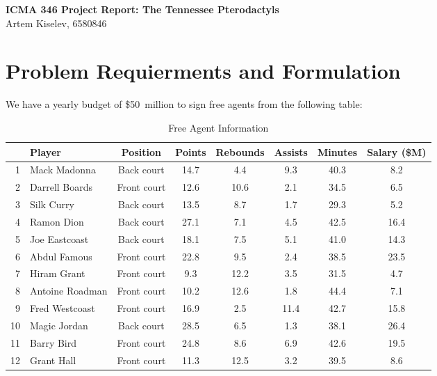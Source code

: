\documentclass[a4paper,11pt]{article}
\begin{document}
{\Large \textbf{ICMA 346 Project Report: The Tennessee Pterodactyls}}\\
{\normalsize Artem Kiselev, 6580846}

\section{Problem Requierments and Formulation}
We have a yearly budget of \$50~million to sign free agents from the following table:

\begin{table}[htbp]
\centering
\renewcommand{\arraystretch}{1}
\begin{tabular}{rlcccccc}
\hline
& \textbf{Player} & \textbf{Position} & \textbf{Points} & \textbf{Rebounds} & \textbf{Assists} & \textbf{Minutes} & \textbf{Salary (\$M)} \\
\hline
1  & Mack Madonna        & Back court  & 14.7 & 4.4  & 9.3 & 40.3 & 8.2  \\
2  & Darrell Boards      & Front court & 12.6 & 10.6 & 2.1 & 34.5 & 6.5  \\
3  & Silk Curry          & Back court  & 13.5 & 8.7  & 1.7 & 29.3 & 5.2  \\
4  & Ramon Dion          & Back court  & 27.1 & 7.1  & 4.5 & 42.5 & 16.4 \\
5  & Joe Eastcoast       & Back court  & 18.1 & 7.5  & 5.1 & 41.0 & 14.3 \\
6  & Abdul Famous        & Front court & 22.8 & 9.5  & 2.4 & 38.5 & 23.5 \\
7  & Hiram Grant         & Front court & 9.3  & 12.2 & 3.5 & 31.5 & 4.7  \\
8  & Antoine Roadman     & Front court & 10.2 & 12.6 & 1.8 & 44.4 & 7.1  \\
9  & Fred Westcoast      & Front court & 16.9 & 2.5  & 11.4 & 42.7 & 15.8 \\
10 & Magic Jordan        & Back court  & 28.5 & 6.5  & 1.3 & 38.1 & 26.4 \\
11 & Barry Bird          & Front court & 24.8 & 8.6  & 6.9 & 42.6 & 19.5 \\
12 & Grant Hall          & Front court & 11.3 & 12.5 & 3.2 & 39.5 & 8.6  \\
\hline
\end{tabular}
\caption{Free Agent Information}
\end{table}
\end{document}
